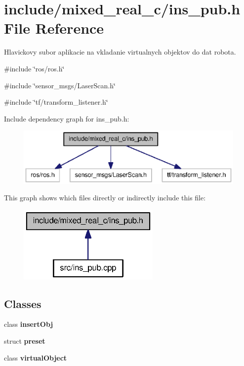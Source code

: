 \section{include/mixed\_\-real\_\-c/ins\_\-pub.h File Reference}
\label{ins__pub_8h}


Hlavickovy subor aplikacie na vkladanie virtualnych objektov do dat robota.  


{\ttfamily \#include \char`\"{}ros/ros.h\char`\"{}}\par
{\ttfamily \#include \char`\"{}sensor\_\-msgs/LaserScan.h\char`\"{}}\par
{\ttfamily \#include \char`\"{}tf/transform\_\-listener.h\char`\"{}}\par
Include dependency graph for ins\_\-pub.h:\nopagebreak
\begin{figure}[H]
\begin{center}
\leavevmode
\includegraphics[width=378pt]{ins__pub_8h__incl}
\end{center}
\end{figure}
This graph shows which files directly or indirectly include this file:\nopagebreak
\begin{figure}[H]
\begin{center}
\leavevmode
\includegraphics[width=196pt]{ins__pub_8h__dep__incl}
\end{center}
\end{figure}
\subsection*{Classes}
\begin{DoxyCompactItemize}
\item 
class {\bf insertObj}
\item 
struct {\bf preset}
\item 
class {\bf virtualObject}
\end{DoxyCompactItemize}
